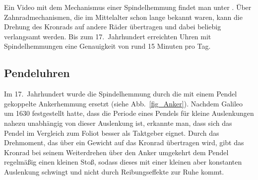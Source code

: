  Ein Video mit dem Mechanismus einer Spindelhemmung findet man unter \cite{Verge}. 
 \"Uber Zahnradmechanismen, die im Mittelalter schon lange bekannt waren, 
 kann die Drehung des Kronrads auf andere R\"ader \"ubertragen und
 dabei beliebig verlangsamt werden. Bis zum 17.\ Jahrhundert erreichten Uhren mit Spindelhemmungen eine
 Genauigkeit von rund 15 Minuten pro Tag. 
 
 \subsection{Pendeluhren}

Im 17.\ Jahrhundert wurde die Spindelhemmung durch die mit einem Pendel gekoppelte 
Ankerhemmung
ersetzt (siehe Abb.\ \ref{fig_Anker}). 
Nachdem Galileo 
um 1630 festgestellt hatte, dass die Periode eines Pendels f\"ur kleine Auslenkungen 
nahezu unabh\"angig von dieser Auslenkung ist, erkannte man, dass sich das Pendel im Vergleich zum Foliot 
besser als Taktgeber eignet. Durch das Drehmoment, das \"uber ein Gewicht auf das Kronrad \"ubertragen
wird, gibt das Kronrad bei seinem Weiterdrehen \"uber den Anker umgekehrt dem Pendel regelm\"a\ss ig 
einen kleinen Sto\ss, sodass dieses 
mit einer kleinen aber konstanten Auslenkung schwingt und nicht durch Reibungseffekte zur Ruhe kommt. 

